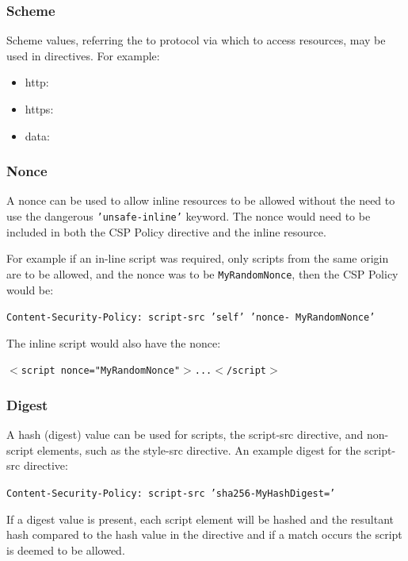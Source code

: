 \documentclass{mscreport}
\begin{document}
\subsubsection{Scheme}
Scheme values, referring the to protocol via which to access resources, may be used in directives. For example:

\begin{itemize}
	\setlength\itemsep{0.1em}
	\item http:
	\item https:
	\item data:
\end{itemize}


\subsubsection{Nonce}
A nonce can be used to allow inline resources to be allowed without the need to use the dangerous \texttt{'unsafe-inline'} keyword. The nonce would need to be included in both the CSP Policy directive and the inline resource.

\vspace{0.3cm} \noindent
For example if an in-line script was required, only scripts from the same origin are to be allowed, and the nonce was to be \texttt{MyRandomNonce}, then the CSP Policy would be:

\vspace{0.3cm} \noindent
\texttt{Content-Security-Policy: script-src 'self' 'nonce- MyRandomNonce'}

\vspace{0.3cm} \noindent
The inline script would also have the nonce:

\vspace{0.3cm} \noindent
\texttt{$<$script nonce="MyRandomNonce"$>$...$<$/script$>$}


\subsubsection{Digest}

A hash (digest) value can be used for scripts, the script-src directive, and non-script elements, such as the style-src directive. An example digest for the script-src directive:

\vspace{0.3cm} \noindent
\texttt{Content-Security-Policy: script-src 'sha256-MyHashDigest='}

\vspace{0.3cm} \noindent
If a digest value is present, each script element will be hashed and the resultant hash compared to the hash value in the directive and if a match occurs the script is deemed to be allowed.
\end{document}
